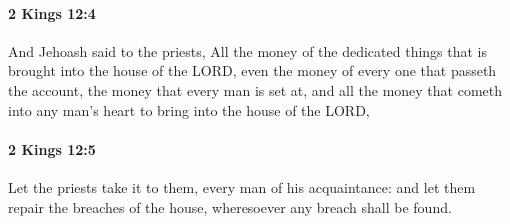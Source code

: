 		\paragraph{2 Kings 12:4} %
			\label{2KINGS-12-4}

			And Jehoash said to the priests, All the money of the dedicated things that is brought into the house of the LORD, even the money of every one that passeth the account, the money that every man is set at, and all the money that cometh into any man’s heart to bring into the house of the LORD,


		\paragraph{2 Kings 12:5} %
			\label{2KINGS-12-5}

			Let the priests take it to them, every man of his acquaintance: and let them repair the breaches of the house, wheresoever any breach shall be found.

